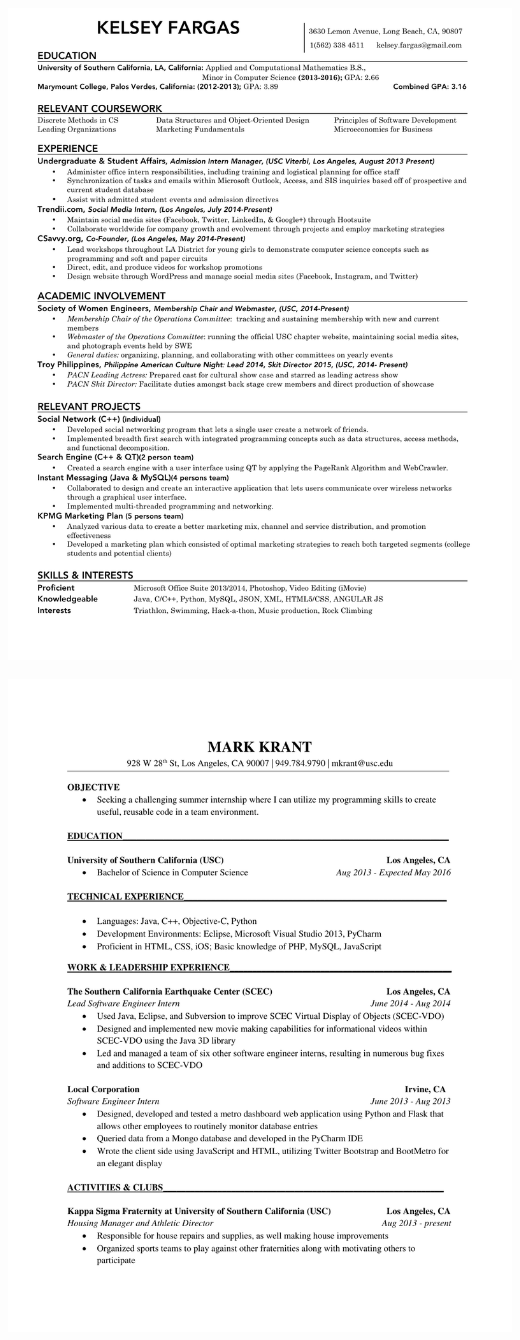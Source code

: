 \documentclass[]{article}
\begin{document}
\includegraphics{kelsey.pdf}
\pagebreak

\pagebreak

\includegraphics{mark.pdf}
\pagebreak
\end{document}
